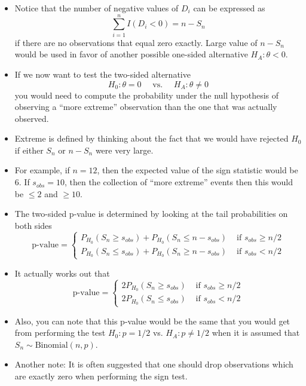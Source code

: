 \documentclass[]{book}
\begin{document}
\begin{itemize}
\item
  Notice that the number of negative values of \(D_{i}\) can be expressed as
  \begin{equation}
  \sum_{i=1}^{n} I(D_{i} < 0) = n - S_{n}
  \end{equation}
  if there are no observations that equal zero exactly. Large value of \(n - S_{n}\)
  would be used in favor of another possible one-sided alternative \(H_{A}: \theta < 0\).
\item
  If we now want to test the two-sided alternative
  \begin{equation}
  H_{0}: \theta = 0 \quad \textrm{ vs. }  \quad H_{A}: \theta \neq 0 \nonumber
  \end{equation}
  you would need to compute the probability under the null hypothesis of observing
  a ``more extreme'' observation than the one that was actually observed.
\item
  Extreme is defined by thinking about the fact that we would have rejected \(H_{0}\)
  if either \(S_{n}\) or \(n - S_{n}\) were very large.
\item
  For example, if \(n = 12\), then the expected value of the sign statistic would be \(6\).
  If \(s_{obs} = 10\), then the collection of ``more extreme'' events then this would be
  \(\leq 2\) and \(\geq 10\).
\item
  The two-sided p-value is determined by looking at the tail probabilities on both sides
  \begin{equation}
  \textrm{p-value} = 
  \begin{cases}
  P_{H_{0}}(S_{n} \geq s_{obs}) + P_{H_{0}}(S_{n} \leq n - s_{obs}) & \textrm{ if } s_{obs} \geq n/2 \\
  P_{H_{0}}(S_{n} \leq s_{obs}) + P_{H_{0}}(S_{n} \geq n - s_{obs}) & \textrm{ if } s_{obs} < n/2
  \end{cases}
  \end{equation}
\item
  It actually works out that
  \begin{equation}
  \textrm{p-value} = 
  \begin{cases}
  2 P_{H_{0}}(S_{n} \geq s_{obs})   & \textrm{ if } s_{obs} \geq n/2 \\
  2 P_{H_{0}}(S_{n} \leq s_{obs})   & \textrm{ if } s_{obs} < n/2
  \end{cases}
  \end{equation}
\item
  Also, you can note that this p-value would be the same that you would get from performing the test
  \(H_{0}: p = 1/2\) vs. \(H_{A}: p \neq 1/2\) when it is assumed that \(S_{n} \sim \textrm{Binomial}(n, p)\).
\item
  Another note: It is often suggested that one should drop observations which are exactly zero
  when performing the sign test.
\end{itemize}
\end{document}
